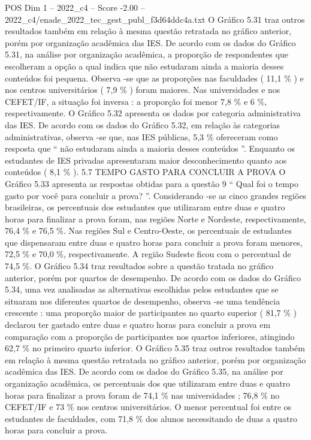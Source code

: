 \begin{textsample}{POS Dim 1 – 2022\_c4 – Score -2.00 – 2022\_c4/enade\_2022\_tec\_gest\_publ\_f3d64ddc4a.txt}
O Gráfico 5.31 traz outros resultados também em relação à mesma questão retratada no gráfico anterior, porém por organização acadêmica das IES.
De acordo com os dados do Gráfico 5.31, na análise por organização acadêmica, a proporção de respondentes que escolheram a opção a qual indica que não estudaram ainda a maioria desses conteúdos foi pequena.
Observa -se que as proporções nas faculdades ( 11,1 \% ) e nos centros universitários ( 7,9 \% ) foram maiores.
Nas universidades e nos CEFET/IF, a situação foi inversa : a proporção foi menor 7,8 \% e 6 \%, respectivamente.
O Gráfico 5.32 apresenta os dados por categoria administrativa das IES.
De acordo com os dados do Gráfico 5.32, em relação às categorias administrativas, observa -se que, nas IES públicas, 5,3 \% ofereceram como resposta que “ não estudaram ainda a maioria desses conteúdos ”.
Enquanto os estudantes de IES privadas apresentaram maior desconhecimento quanto aos conteúdos ( 8,1 \% ). 5.7 TEMPO GASTO PARA CONCLUIR A PROVA O Gráfico 5.33 apresenta as respostas obtidas para a questão 9 “ Qual foi o tempo gasto por você para concluir a prova? ”.
Considerando -se as cinco grandes regiões brasileiras, os percentuais dos estudantes que utilizaram entre duas e quatro horas para finalizar a prova foram, nas regiões Norte e Nordeste, respectivamente, 76,4 \% e 76,5 \%.
Nas regiões Sul e Centro-Oeste, os percentuais de estudantes que dispensaram entre duas e quatro horas para concluir a prova foram menores, 72,5 \% e 70,0 \%, respectivamente.
A região Sudeste ficou com o percentual de 74,5 \%.
O Gráfico 5.34 traz resultados sobre a questão tratada no gráfico anterior, porém por quartos de desempenho.
De acordo com os dados do Gráfico 5.34, uma vez analisadas as alternativas escolhidas pelos estudantes que se situaram nos diferentes quartos de desempenho, observa -se uma tendência crescente : uma proporção maior de participantes no quarto superior ( 81,7 \% ) declarou ter gastado entre duas e quatro horas para concluir a prova em comparação com a proporção de participantes nos quartos inferiores, atingindo 62,7 \% no primeiro quarto inferior.
O Gráfico 5.35 traz outros resultados também em relação à mesma questão retratada no gráfico anterior, porém por organização acadêmica das IES.
De acordo com os dados do Gráfico 5.35, na análise por organização acadêmica, os percentuais dos que utilizaram entre duas e quatro horas para finalizar a prova foram de 74,1 \% nas universidades ; 76,8 \% no CEFET/IF e 73 \% nos centros universitários.
O menor percentual foi entre os estudantes de faculdades, com 71,8 \% dos alunos necessitando de duas a quatro horas para concluir a prova.

\end{textsample}
